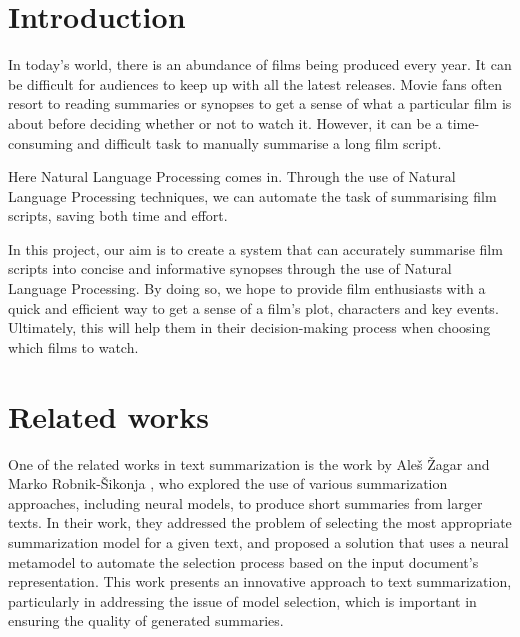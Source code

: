 \documentclass[fleqn,moreauthors,10pt]{ds_report}
\affiliation{\textit{Advisor: Slavko Žitnik}}
\begin{document}
\addto{}

\flushbottom 

\maketitle 

\thispagestyle{empty} 


\section*{Introduction}

In today's world, there is an abundance of films being produced every year. It can be difficult for audiences to keep up with all the latest releases. Movie fans often resort to reading summaries or synopses to get a sense of what a particular film is about before deciding whether or not to watch it. However, it can be a time-consuming and difficult task to manually summarise a long film script.

Here Natural Language Processing comes in. Through the use of Natural Language Processing techniques, we can automate the task of summarising film scripts, saving both time and effort.

In this project, our aim is to create a system that can accurately summarise film scripts into concise and informative synopses through the use of Natural Language Processing. By doing so, we hope to provide film enthusiasts with a quick and efficient way to get a sense of a film's plot, characters and key events. Ultimately, this will help them in their decision-making process when choosing which films to watch.


\section*{Related works}

One of the related works in text summarization is the work by Aleš Žagar and Marko  Robnik-Šikonja \cite{zagar2022}, who explored the use of various summarization approaches, including neural models, to produce short summaries from larger texts. In their work, they addressed the problem of selecting the most appropriate summarization model for a given text, and proposed a solution that uses a neural metamodel to automate the selection process based on the input document's representation. This work presents an innovative approach to text summarization, particularly in addressing the issue of model selection, which is important in ensuring the quality of generated summaries.
\end{document}
